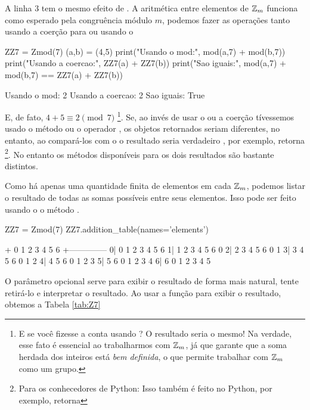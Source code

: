 A linha $3$ tem o mesmo efeito de .
A aritmética entre elementos de $\mathbb{Z}_m$ funciona como 
esperado pela congruência módulo $m$, podemos
fazer as operações tanto usando a coerção para 
ou usando o 
\begin{sageinput}
ZZ7 = Zmod(7)
(a,b) = (4,5)
print("Usando o mod:", mod(a,7) + mod(b,7))
print("Usando a coercao:", ZZ7(a) + ZZ7(b))
print("Sao iguais:", mod(a,7) + mod(b,7) == ZZ7(a) + ZZ7(b))
\end{sageinput}
\begin{sageoutput}
Usando o mod: 2
Usando a coercao: 2
Sao iguais: True
\end{sageoutput}
E, de fato, $4 + 5 \equiv 2 \pmod 7$ \footnote{E se você
fizesse a conta usando ? O resultado seria
o mesmo! Na verdade, esse fato é essencial ao trabalharmos
com $\mathbb{Z}_m$, já que garante que a soma herdada dos inteiros
está \emph{bem definida}, o que permite trabalhar com
$\mathbb{Z}_m$ como um grupo.}.
Se, ao invés de usar o  ou a coerção tívessemos
usado o método  ou o operador \ils{\%}, 
os objetos retornados seriam diferentes, no entanto,
ao compará-los com o \ils{==} o resultado seria verdadeiro
, por exemplo,  retorna 
\footnote{Para os conhecedores de Python: Isso também
é feito no Python, por exemplo, 
retorna }. No entanto os métodos disponíveis
para os dois resultados são bastante distintos.

Como há apenas uma quantidade finita de elementos em cada
$\mathbb{Z}_m$, podemos listar o resultado de todas as somas possíveis
entre seus elementos. Isso pode ser feito usando o
o método .
\begin{sageinput}
ZZ7 = Zmod(7)
ZZ7.addition_table(names='elements')                                                               
\end{sageinput}
\begin{sageoutput}
+  0 1 2 3 4 5 6
 +--------------
0| 0 1 2 3 4 5 6
1| 1 2 3 4 5 6 0
2| 2 3 4 5 6 0 1
3| 3 4 5 6 0 1 2
4| 4 5 6 0 1 2 3
5| 5 6 0 1 2 3 4
6| 6 0 1 2 3 4 5
\end{sageoutput}
O parâmetro opcional  serve para
exibir o resultado de forma mais natural, tente retirá-lo
e interpretar o resultado. Ao usar
a função  para exibir o resultado, obtemos a 
Tabela \ref{tab:Z7}

